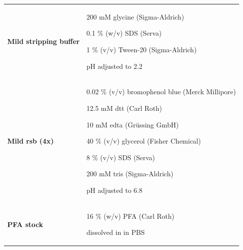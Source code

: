\begin{longtable}{|Y{3.9cm}|m{10.7cm}|}
\textbf{\textbf{Mild stripping buffer}} &  \vspace{2mm}
            200 mM          glycine       (Sigma-Aldrich)    \par \vspace{2mm}
            0.1 \% (w/v)     \gls{SDS}     (Serva)            \par \vspace{2mm}
            1 \% (v/v)       Tween-20      (Sigma-Aldrich)    \par \vspace{2mm}
            pH adjusted to 2.2 \vspace{2mm} \\

\textbf{Mild \gls{rsb} (4x)} & \vspace{2mm} 
            0.02 \% (v/v)    bromophenol blue	  (Merck Millipore) \par \vspace{2mm}
            12.5 mM       	\gls{dtt}	          (Carl Roth)        \par \vspace{2mm}
            10 mM           \gls{edta}            (Grüssing GmbH)       \par \vspace{2mm}
            40 \% (v/v)	    glycerol         	  (Fisher Chemical) \par \vspace{2mm}
            8 \% (v/v)	    \gls{SDS}             (Serva)              \par \vspace{2mm}
            200 mM          \gls{tris}            (Sigma-Aldrich)        \par \vspace{2mm}
            pH adjusted to 6.8 \vspace{2mm} \\

\textbf{\Gls{PFA} stock}   &\vspace{2mm}
                16 \% (w/v) {PFA}   (Carl Roth)             \par \vspace{2mm}
                dissolved in in \gls{PBS}                \vspace{2mm} \\


\end{longtable}
